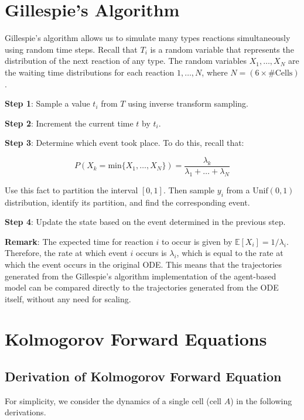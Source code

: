 \documentclass{article}
\begin{document}
\begin{flushleft}

\section{Gillespie's Algorithm} \label{sec:gillespie}

Gillespie's algorithm allows us to simulate many types reactions simultaneously using random time steps. Recall that $T_{i}$ is a random variable that represents the distribution of the next reaction of any type. The random variables $X_{1}, \dots, X_{N}$ are the waiting time distributions for each reaction $1, \dots, N$, where $N = (6 \times \text{\# Cells})$.

\textbf{Step 1}: Sample a value $t_{i}$ from $T$ using inverse transform sampling. 

\textbf{Step 2}: Increment the current time $t$ by $t_{i}$.

\textbf{Step 3}: Determine which event took place. To do this, recall that:

$$P(X_{k} = \text{min} \{  X_{1}, \dots, X_{N} \}) = \frac{\lambda_{k}}{\lambda_{1} + \dots + \lambda_{N}}$$

Use this fact to partition the interval $[0, 1]$. Then sample $y_{i}$ from a $\text{Unif}(0, 1)$ distribution, identify its partition, and find the corresponding event.

\textbf{Step 4}: Update the state based on the event determined in the previous step.

\textbf{Remark}: The expected time for reaction $i$ to occur is given by $\mathbb{E}[X_{i}] = 1/\lambda_{i}$. Therefore, the rate at which event $i$ occurs is $\lambda_{i}$, which is equal to the rate at which the event occurs in the original ODE. This means that the trajectories generated from the Gillespie's algorithm implementation of the agent-based  model can be compared directly to the trajectories generated from the ODE itself, without any need for scaling.


\section{Kolmogorov Forward Equations}
\label{sec:kfe}


\subsection*{Derivation of Kolmogorov Forward Equation}
For simplicity, we consider the dynamics of a single cell (cell $A$) in the following derivations.


\end{flushleft}
\end{document}
